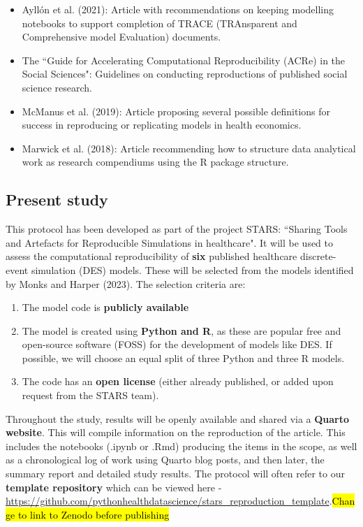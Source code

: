 \begin{itemize}
    \item Ayllón et al. (2021):\autocite{ayllon_keeping_2021} Article with recommendations on keeping modelling notebooks to support completion of TRACE (TRAnsparent and Comprehensive model Evaluation) documents.
    \item The ``Guide for Accelerating Computational Reproducibility (ACRe) in the Social Sciences":\autocite{berkeley_initiative_for_transparency_in_the_social_sciences_guide_2022} Guidelines on conducting reproductions of published social science research.
    \item McManus et al. (2019):\autocite{mcmanus_can_2019} Article proposing several possible definitions for success in reproducing or replicating models in health economics.
    \item Marwick et al. (2018):\autocite{marwick_packaging_2018} Article recommending how to structure data analytical work as research compendiums using the R package structure.
\end{itemize}

\vspace{0.5cm}
\subsection{Present study}

This protocol has been developed as part of the project STARS: ``Sharing Tools and Artefacts for Reproducible Simulations in healthcare". It will be used to assess the computational reproducibility of \textbf{six} published healthcare discrete-event simulation (DES) models. These will be selected from the models identified by Monks and Harper (2023).\autocite{monks_computer_2023} The selection criteria are:

\begin{enumerate}
    \item The model code is \textbf{publicly available}
    \item The model is created using \textbf{Python and R}, as these are popular free and open-source software (FOSS) for the development of models like DES.\autocite{monks_computer_2023} If possible, we will choose an equal split of three Python and three R models.
    \item The code has an \textbf{open license} (either already published, or added upon request from the STARS team).
\end{enumerate}

Throughout the study, results will be openly available and shared via a \textbf{Quarto website}\autocite{allaire_quarto_2024}. This will compile information on the reproduction of the article. This includes the notebooks (.ipynb or .Rmd) producing the items in the scope, as well as a chronological log of work using Quarto blog posts, and then later, the summary report and detailed study results. The protocol will often refer to our \textbf{template repository} which can be viewed here -\url{https://github.com/pythonhealthdatascience/stars_reproduction_template}.\hl{Change to link to Zenodo before publishing}

